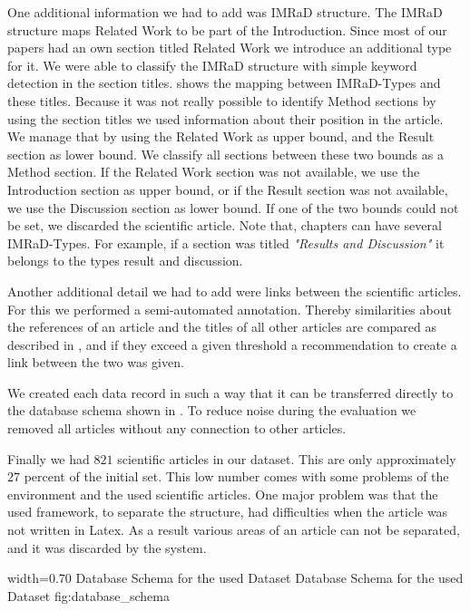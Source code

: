 One additional information we had to add was IMRaD structure. The IMRaD structure maps Related Work to be part of the Introduction. Since most of our papers had an own section titled Related Work we introduce an additional type for it. We were able to classify the IMRaD structure with simple keyword detection in the section titles.  shows the mapping between IMRaD-Types and these titles. Because it was not really possible to identify Method sections by using the section titles we used information about their position in the article. We manage that by using the Related Work as upper bound, and the Result section as lower bound. We classify all sections between these two bounds as a Method section. If the Related Work section was not available, we use the Introduction section as upper bound, or if the Result section was not available, we use the Discussion section as lower bound. If one of the two bounds could not be set, we discarded the scientific article. Note that, chapters can have several IMRaD-Types. For example, if a section was titled \textit{"Results and Discussion"} it belongs to the types result and discussion.

Another additional detail we had to add were links between the scientific articles. For this we performed a semi-automated annotation. Thereby similarities about the references of an article and the titles of all other articles are compared as described in , and if they exceed a given threshold a recommendation to create a link between the two was given.

We created each data record in such a way that it can be transferred directly to the database schema shown in . To reduce noise during the evaluation we removed all articles without any connection to other articles.

Finally we had $821$ scientific articles in our dataset. This are only approximately $27$ percent of the initial set. This low number comes with some problems of the environment and the used scientific articles. One major problem was that the used framework, to separate the structure, had difficulties when the article was not written in Latex. As a result various areas of an article can not be separated, and it was discarded by the system.

      {width=0.70\textwidth}
      {Database Schema for the used Dataset}
      {Database Schema for the used Dataset}
      {fig:database_schema}

